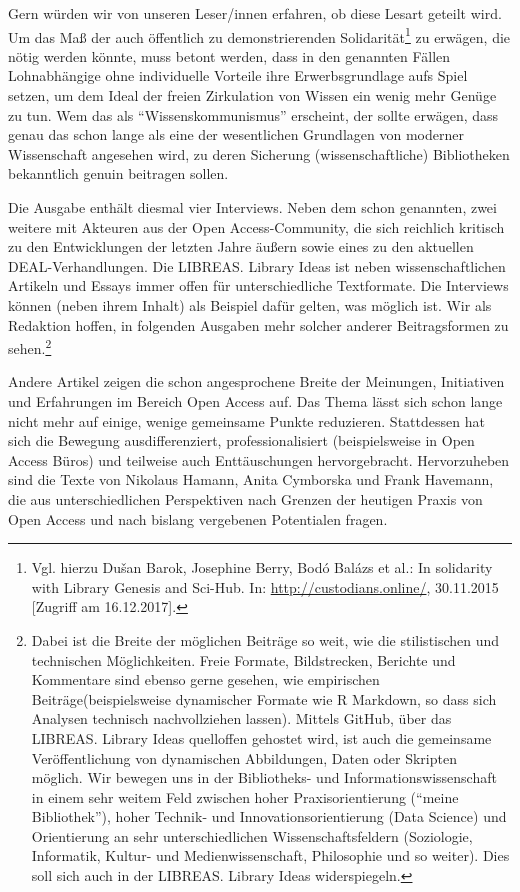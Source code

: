 \documentclass[a4paper,
fontsize=11pt,
oneside,
numbers=noperiodatend,
parskip=half-,
bibliography=totoc,
final
]{scrartcl}
\begin{document}
Gern würden wir von unseren Leser/innen erfahren, ob diese Lesart
geteilt wird. Um das Maß der auch öffentlich zu demonstrierenden
Solidarität\footnote{Vgl. hierzu Dušan Barok, Josephine Berry, Bodó
  Balázs et al.: In solidarity with Library Genesis and Sci-Hub. In:
  \url{http://custodians.online/}, 30.11.2015 {[}Zugriff am
  16.12.2017{]}.} zu erwägen, die nötig werden könnte, muss betont
werden, dass in den genannten Fällen Lohnabhängige ohne individuelle
Vorteile ihre Erwerbsgrundlage aufs Spiel setzen, um dem Ideal der
freien Zirkulation von Wissen ein wenig mehr Genüge zu tun. Wem das als
\enquote{Wissenskommunismus} erscheint, der sollte erwägen, dass genau
das schon lange als eine der wesentlichen Grundlagen von moderner
Wissenschaft angesehen wird, zu deren Sicherung (wissenschaftliche)
Bibliotheken bekanntlich genuin beitragen sollen.

Die Ausgabe enthält diesmal vier Interviews. Neben dem schon genannten,
zwei weitere mit Akteuren aus der Open Access-Community, die sich
reichlich kritisch zu den Entwicklungen der letzten Jahre äußern sowie
eines zu den aktuellen DEAL-Verhandlungen. Die LIBREAS. Library Ideas
ist neben wissenschaftlichen Artikeln und Essays immer offen für
unterschiedliche Textformate. Die Interviews können (neben ihrem Inhalt)
als Beispiel dafür gelten, was möglich ist. Wir als Redaktion hoffen, in
folgenden Ausgaben mehr solcher anderer Beitragsformen zu
sehen.\footnote{Dabei ist die Breite der möglichen Beiträge so weit, wie
  die stilistischen und technischen Möglichkeiten. Freie Formate,
  Bildstrecken, Berichte und Kommentare sind ebenso gerne gesehen, wie
  empirischen Beiträge(beispielsweise dynamischer Formate wie R
  Markdown, so dass sich Analysen technisch nachvollziehen lassen).
  Mittels GitHub, über das LIBREAS. Library Ideas quelloffen gehostet
  wird, ist auch die gemeinsame Veröffentlichung von dynamischen
  Abbildungen, Daten oder Skripten möglich. Wir bewegen uns in der
  Bibliotheks- und Informationswissenschaft in einem sehr weitem Feld
  zwischen hoher Praxisorientierung (\enquote{meine Bibliothek}), hoher
  Technik- und Innovationsorientierung (Data Science) und Orientierung
  an sehr unterschiedlichen Wissenschaftsfeldern (Soziologie,
  Informatik, Kultur- und Medienwissenschaft, Philosophie und so
  weiter). Dies soll sich auch in der LIBREAS. Library Ideas
  widerspiegeln.}

Andere Artikel zeigen die schon angesprochene Breite der Meinungen,
Initiativen und Erfahrungen im Bereich Open Access auf. Das Thema lässt
sich schon lange nicht mehr auf einige, wenige gemeinsame Punkte
reduzieren. Stattdessen hat sich die Bewegung ausdifferenziert,
professionalisiert (beispielsweise in Open Access Büros) und teilweise
auch Enttäuschungen hervorgebracht. Hervorzuheben sind die Texte von
Nikolaus Hamann, Anita Cymborska und Frank Havemann, die aus
unterschiedlichen Perspektiven nach Grenzen der heutigen Praxis von Open
Access und nach bislang vergebenen Potentialen fragen.
\end{document}
